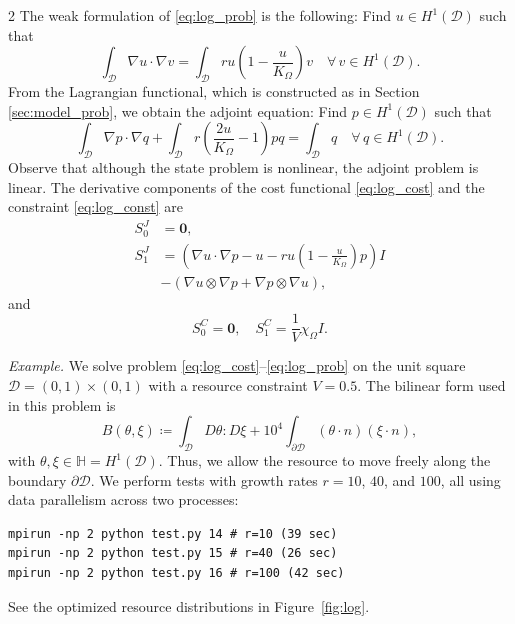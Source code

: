 \documentclass[a4paper, oneside]{article}
\begin{document}
\begin{multicols}{2}
The weak formulation of \eqref{eq:log_prob} is the following:
Find $u\in H^1(\mathcal{D})$ such that
\begin{equation}\label{eq:log_weak}
	\int_{\mathcal{D}}\nabla u \cdot \nabla v =
    \int_{\mathcal{D}}ru\left(1-\frac{u}{K_{\Omega}}\right)v
    \quad
    \forall \, v \in  H^1(\mathcal{D}).
\end{equation}
From the Lagrangian functional, which is constructed as in Section \ref{sec:model_prob},
we obtain the adjoint equation:
Find $p\in H^1(\mathcal{D})$ such that
\begin{equation*}
	\int_{\mathcal{D}}\nabla p \cdot \nabla q +
    \int_{\mathcal{D}}r\left(\frac{2u}{K_{\Omega}}-1\right)pq = 
    \int_{\mathcal{D}}q
    \quad
    \forall \, q \in  H^1(\mathcal{D}).
\end{equation*}
Observe that although the state problem is nonlinear, the adjoint problem is linear.
The derivative components of the cost functional \eqref{eq:log_cost} and the constraint \eqref{eq:log_const} are
\begin{align*}
	S^J_0 &= \boldsymbol{0},\\
	S^J_1 &= \left(\nabla u\cdot\nabla p-u-ru\left(1-\frac{u}{K_{\Omega}}\right)p\right)I \\
		  &-(\nabla u\otimes\nabla p+\nabla p\otimes\nabla u),	
\end{align*}
and
\begin{equation*}
	S_0^C = \boldsymbol{0}, \quad S_1^C = \frac{1}{V} \chi_{\Omega}I.
\end{equation*}

\noindent\textit{Example.}
We solve problem \eqref{eq:log_cost}--\eqref{eq:log_prob} on the unit square $\mathcal{D} = (0,1)\times(0,1)$
with a resource constraint $V=0.5$. The bilinear form used in this problem is
\begin{equation*}
	B(\theta, \xi) \coloneqq
	\int_{\mathcal{D}} D\theta : D\xi +
	{10}^4 \int_{\partial \mathcal{D}}  (\theta \cdot n) (\xi \cdot n),	
\end{equation*}
with $\theta, \xi \in \mathbb{H}=H^1(\mathcal{D})$.
Thus, we allow the resource to move freely along the boundary $\partial \mathcal{D}$.
We perform tests with growth rates $r = 10$, $40$, and $100$, all using data parallelism across two processes:
\begin{lstlisting}
mpirun -np 2 python test.py 14 # r=10 (39 sec)
mpirun -np 2 python test.py 15 # r=40 (26 sec)
mpirun -np 2 python test.py 16 # r=100 (42 sec)	 
\end{lstlisting}
See the optimized resource distributions in Figure~\ref{fig:log}.


\end{multicols}
\end{document}
